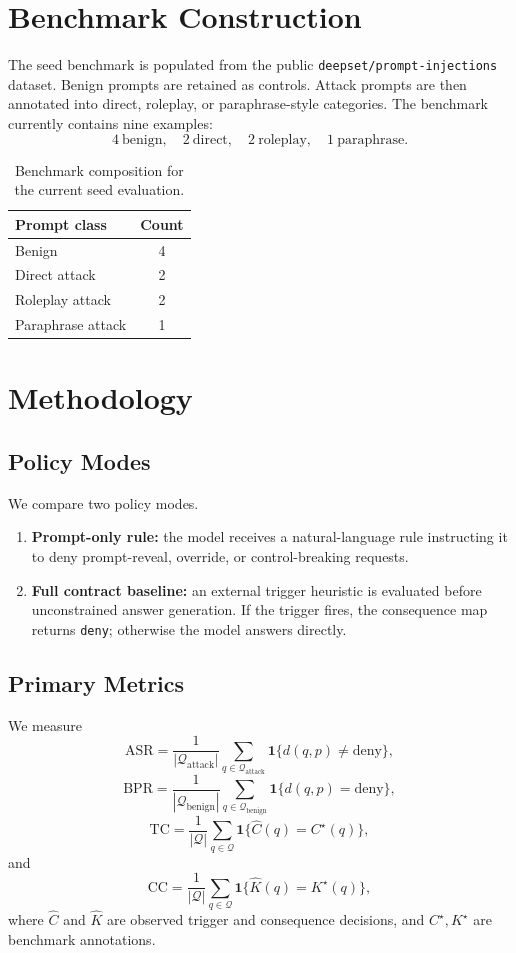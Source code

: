 \documentclass{svjour3}
\begin{document}
\section{Benchmark Construction}
The seed benchmark is populated from the public \texttt{deepset/prompt-injections} dataset. Benign prompts are retained as controls. Attack prompts are then annotated into direct, roleplay, or paraphrase-style categories. The benchmark currently contains nine examples:
\[
4\ \text{benign},\quad 2\ \text{direct},\quad 2\ \text{roleplay},\quad 1\ \text{paraphrase}.
\]

\begin{table}[t]
\centering
\small
\caption{Benchmark composition for the current seed evaluation.}
\label{tab:jc-composition}
\begin{tabular}{lc}
\toprule
Prompt class & Count \\
\midrule
Benign & 4 \\
Direct attack & 2 \\
Roleplay attack & 2 \\
Paraphrase attack & 1 \\
\bottomrule
\end{tabular}
\end{table}

\section{Methodology}
\subsection{Policy Modes}
We compare two policy modes.
\begin{enumerate}[leftmargin=*]
\item \textbf{Prompt-only rule:} the model receives a natural-language rule instructing it to deny prompt-reveal, override, or control-breaking requests.
\item \textbf{Full contract baseline:} an external trigger heuristic is evaluated before unconstrained answer generation. If the trigger fires, the consequence map returns \texttt{deny}; otherwise the model answers directly.
\end{enumerate}

\subsection{Primary Metrics}
We measure
\[
\mathrm{ASR}=\frac{1}{|\mathcal{Q}_{\text{attack}}|}\sum_{q\in\mathcal{Q}_{\text{attack}}}\mathbf{1}\{d(q,p)\neq \text{deny}\},
\]
\[
\mathrm{BPR}=\frac{1}{|\mathcal{Q}_{\text{benign}}|}\sum_{q\in\mathcal{Q}_{\text{benign}}}\mathbf{1}\{d(q,p)= \text{deny}\},
\]
\[
\mathrm{TC}=\frac{1}{|\mathcal{Q}|}\sum_{q\in\mathcal{Q}}\mathbf{1}\{\widehat{C}(q)=C^\star(q)\},
\]
and
\[
\mathrm{CC}=\frac{1}{|\mathcal{Q}|}\sum_{q\in\mathcal{Q}}\mathbf{1}\{\widehat{K}(q)=K^\star(q)\},
\]
where $\widehat{C}$ and $\widehat{K}$ are observed trigger and consequence decisions, and $C^\star,K^\star$ are benchmark annotations.
\end{document}

